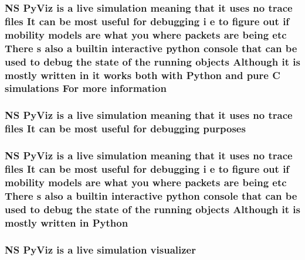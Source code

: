 \subsubsection[{\texorpdfstring{information}{information}}]{\setlength{\rightskip}{0pt plus 5cm}NS Py\+Viz is a live simulation meaning that it uses no trace files It can be most useful for debugging {\bf i} e to {\bf figure} out {\bf if} mobility models are what you where packets are being etc There {\bf s} also a builtin interactive python console that can be used to debug the state of the running objects Although it is mostly written in it works both with {\bf Python} and pure {\bf C} simulations For more information}\hypertarget{doc_2readme_8txt_a56b8f954d58753a81bcf37ef0ad7ca0a}{}\label{doc_2readme_8txt_a56b8f954d58753a81bcf37ef0ad7ca0a}
\subsubsection[{\texorpdfstring{purposes}{purposes}}]{\setlength{\rightskip}{0pt plus 5cm}NS Py\+Viz is a live simulation meaning that it uses no trace files It can be most useful for debugging purposes}\hypertarget{doc_2readme_8txt_a4c5e4286887f08a5384019de28036aaa}{}\label{doc_2readme_8txt_a4c5e4286887f08a5384019de28036aaa}
\subsubsection[{\texorpdfstring{Python}{Python}}]{\setlength{\rightskip}{0pt plus 5cm}NS Py\+Viz is a live simulation meaning that it uses no trace files It can be most useful for debugging {\bf i} e to {\bf figure} out {\bf if} mobility models are what you where packets are being etc There {\bf s} also a builtin interactive python console that can be used to debug the state of the running objects Although it is mostly written in Python}\hypertarget{doc_2readme_8txt_a5f34ac27f170e8e75dec4f484d4c44a3}{}\label{doc_2readme_8txt_a5f34ac27f170e8e75dec4f484d4c44a3}
\subsubsection[{\texorpdfstring{visualizer}{visualizer}}]{\setlength{\rightskip}{0pt plus 5cm}NS Py\+Viz is a live simulation visualizer}\hypertarget{doc_2readme_8txt_a4434c32db43d9f36afb6a7a88be7f1d8}{}\label{doc_2readme_8txt_a4434c32db43d9f36afb6a7a88be7f1d8}
